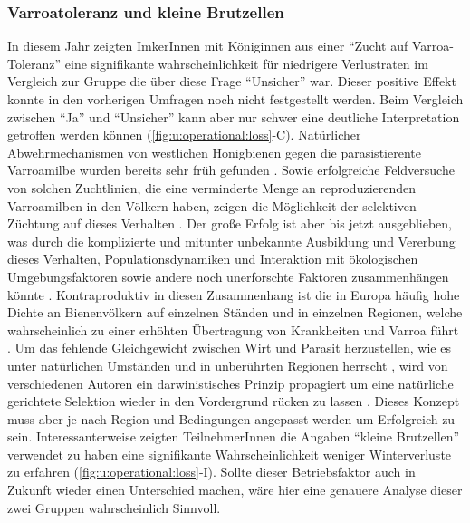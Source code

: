 \subsubsection{Varroatoleranz und kleine Brutzellen}

In diesem Jahr zeigten ImkerInnen mit Königinnen aus einer \enquote{Zucht auf Varroa-Toleranz} eine signifikante wahrscheinlichkeit für niedrigere Verlustraten im Vergleich zur Gruppe die über diese Frage \enquote{Unsicher} war. Dieser positive Effekt konnte in den vorherigen Umfragen noch nicht festgestellt werden. Beim Vergleich zwischen \enquote{Ja} und \enquote{Unsicher} kann aber nur schwer eine deutliche Interpretation getroffen werden können (\cref{fig:u:operational:loss}-C).
\newline
Natürlicher Abwehrmechanismen von westlichen Honigbienen gegen die parasistierente Varroamilbe wurden bereits sehr früh gefunden \citep{ruttner1984}. Sowie erfolgreiche Feldversuche von solchen Zuchtlinien, die eine verminderte Menge an reproduzierenden Varroamilben in den Völkern haben, zeigen die Möglichkeit der selektiven Züchtung auf dieses Verhalten \citep{spivak2007}. Der große Erfolg ist aber bis jetzt ausgeblieben, was durch die komplizierte und mitunter unbekannte Ausbildung und Vererbung dieses Verhalten, Populationsdynamiken und Interaktion mit ökologischen Umgebungsfaktoren sowie andere noch unerforschte Faktoren zusammenhängen könnte \citep{fanny2020}. Kontraproduktiv in diesen Zusammenhang ist die in Europa häufig hohe Dichte an Bienenvölkern auf einzelnen Ständen und in einzelnen Regionen, welche wahrscheinlich zu einer erhöhten Übertragung von Krankheiten und Varroa führt \citep{seeley2015, forfert2016, dynes2019}. Um das fehlende Gleichgewicht zwischen Wirt und Parasit herzustellen, wie es unter natürlichen Umständen und in unberührten Regionen herrscht \citep{seeley2007}, wird von verschiedenen Autoren ein darwinistisches Prinzip propagiert um eine natürliche gerichtete Selektion wieder in den Vordergrund rücken zu lassen \citep{locke2016, neumann2017}. Dieses Konzept muss aber je nach Region und Bedingungen angepasst werden um Erfolgreich zu sein.
\newline
Interessanterweise zeigten TeilnehmerInnen die Angaben \enquote{kleine Brutzellen} verwendet zu haben eine signifikante Wahrscheinlichkeit weniger Winterverluste zu erfahren (\cref{fig:u:operational:loss}-I). Sollte dieser Betriebsfaktor auch in Zukunft wieder einen Unterschied machen, wäre hier eine genauere Analyse dieser zwei Gruppen wahrscheinlich Sinnvoll.


